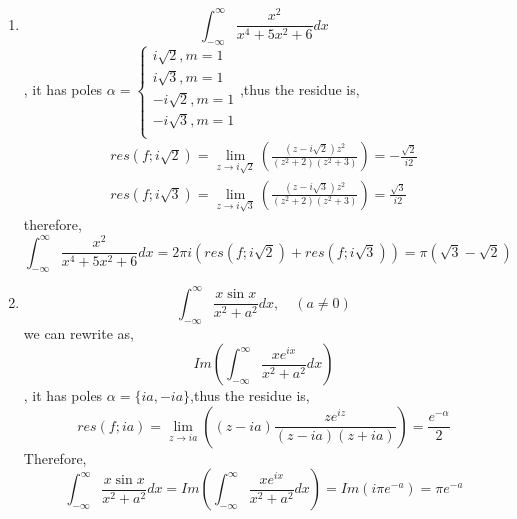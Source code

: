 \documentclass[a4paper,12pt]{article}
\begin{document}
\begin{enumerate}
\begin{enumerate}
	\item $$\int_{-\infty}^{\infty} \frac{x^2}{x^4+5x^2+6}dx$$, it has poles $\alpha=\begin{cases}
	i\sqrt{2}, m = 1\\
	i\sqrt{3}, m = 1\\
	-i\sqrt{2}, m = 1\\
	-i\sqrt{3}, m = 1\\
	\end{cases}$,thus the residue is,
	\begin{equation*}
	\begin{aligned}
	res(f;i\sqrt{2}) = \lim_{z\to i\sqrt{2}} \left( \frac{(z-i\sqrt{2})z^2}{(z^2+2)(z^2+3)} \right) = -\frac{\sqrt{2}}{i2}\\
	res(f;i\sqrt{3}) = \lim_{z\to i\sqrt{3}} \left( \frac{(z-i\sqrt{3})z^2}{(z^2+2)(z^2+3)} \right) = \frac{\sqrt{3}}{i2}
	\end{aligned}
	\end{equation*}
	therefore,
	\begin{equation*}
	\int_{-\infty}^{\infty} \frac{x^2}{x^4+5x^2+6}dx = 2\pi i (res(f;i\sqrt{2}) + res(f;i\sqrt{3})) = \pi \left( \sqrt{3} - \sqrt{2} \right)
	\end{equation*}
	
	\item $$\int_{-\infty}^{\infty} \frac{x \sin x}{x^2 + a^2} dx, \quad (a\neq 0)$$
	we can rewrite as,
	\begin{equation*}
	Im\left( \int_{-\infty}^{\infty} \frac{xe^{ix}}{x^2+a^2} dx \right)
	\end{equation*}, it has poles $\alpha=\{ia,-ia\}$,thus the residue is,
	\begin{equation*}
	res(f;ia) = \lim_{z\to ia} \left( (z-ia) \frac{ze^{iz}}{(z-ia)(z+ia)} \right) = \frac{e^{-\alpha}}{2}
	\end{equation*}
	Therefore,
	\begin{equation*}
	\int_{-\infty}^{\infty} \frac{x \sin x}{x^2 + a^2} dx = Im\left( \int_{-\infty}^{\infty} \frac{xe^{ix}}{x^2+a^2} dx \right) = Im(i\pi e^{-a}) = \pi e^{-a}
	\end{equation*}
\end{enumerate}


\end{enumerate}
\end{document}

